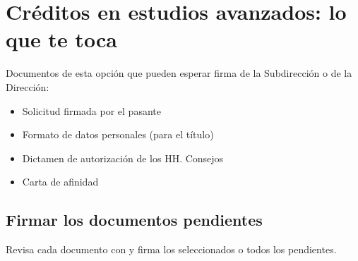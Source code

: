 \section{Créditos en estudios avanzados: lo que te toca}
Documentos de esta opción que pueden esperar firma de la Subdirección o de la Dirección:
\begin{itemize}
  \item Solicitud firmada por el pasante
  \item Formato de datos personales (para el título)
  \item Dictamen de autorización de los HH. Consejos
  \item Carta de afinidad
\end{itemize}
\subsection{Firmar los documentos pendientes}
Revisa cada documento con  y firma los seleccionados o todos los pendientes.
